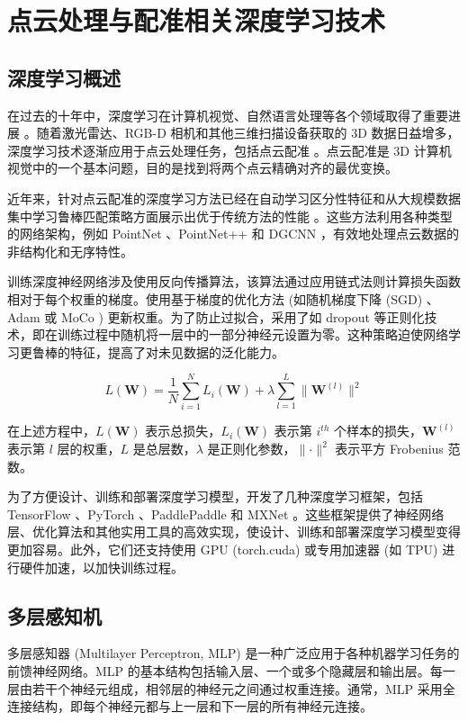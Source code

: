 \section{点云处理与配准相关深度学习技术}

\subsection{深度学习概述}
在过去的十年中，深度学习在计算机视觉、自然语言处理等各个领域取得了重要进展 \cite{lecun2015deep} 。随着激光雷达、RGB-D 相机和其他三维扫描设备获取的 3D 数据日益增多，深度学习技术逐渐应用于点云处理任务，包括点云配准 \cite{wang2019dynamic, choy2020deep} 。点云配准是 3D 计算机视觉中的一个基本问题，目的是找到将两个点云精确对齐的最优变换。

近年来，针对点云配准的深度学习方法已经在自动学习区分性特征和从大规模数据集中学习鲁棒匹配策略方面展示出优于传统方法的性能 \cite{huang2022multiway, lu2019deepvcp} 。这些方法利用各种类型的网络架构，例如 PointNet \cite{qi2017pointnet} 、PointNet++ \cite{qi2017pointnet++} 和 DGCNN \cite{wang2019dynamic} ，有效地处理点云数据的非结构化和无序特性。

训练深度神经网络涉及使用反向传播算法，该算法通过应用链式法则计算损失函数相对于每个权重的梯度。使用基于梯度的优化方法 (如随机梯度下降 (SGD) 、Adam\cite{kingma2014adam} 或 MoCo\cite{he2020momentum} ) 更新权重。为了防止过拟合，采用了如 dropout 等正则化技术，即在训练过程中随机将一层中的一部分神经元设置为零。这种策略迫使网络学习更鲁棒的特征，提高了对未见数据的泛化能力。

\begin{equation}
    L(\boldsymbol{W}) = \frac{1}{N} \sum_{i=1}^{N} L_i(\boldsymbol{W}) + \lambda \sum_{l=1}^{L} \lVert \boldsymbol{W}^{(l)} \rVert^2
\end{equation}

在上述方程中，$L(\boldsymbol{W})$ 表示总损失，$L_i(\boldsymbol{W})$ 表示第 $i^{th}$ 个样本的损失，$\boldsymbol{W}^{(l)}$ 表示第 $l$ 层的权重，$L$ 是总层数，$\lambda$ 是正则化参数，$\lVert \cdot \rVert^2$ 表示平方 Frobenius 范数。

为了方便设计、训练和部署深度学习模型，开发了几种深度学习框架，包括TensorFlow\cite{abadi2016tensorflow} 、PyTorch\cite{paszke2019pytorch} 、PaddlePaddle\cite{ma2019paddlepaddle} 和 MXNet\cite{chen2015mxnet} 。这些框架提供了神经网络层、优化算法和其他实用工具的高效实现，使设计、训练和部署深度学习模型变得更加容易。此外，它们还支持使用 GPU  (torch.cuda) 或专用加速器 (如 TPU) 进行硬件加速，以加快训练过程。
\subsection{多层感知机}
多层感知器 (Multilayer Perceptron, MLP) 是一种广泛应用于各种机器学习任务的前馈神经网络\cite{lecun2015deep}。MLP 的基本结构包括输入层、一个或多个隐藏层和输出层。每一层由若干个神经元组成，相邻层的神经元之间通过权重连接。通常，MLP 采用全连接结构，即每个神经元都与上一层和下一层的所有神经元连接。

